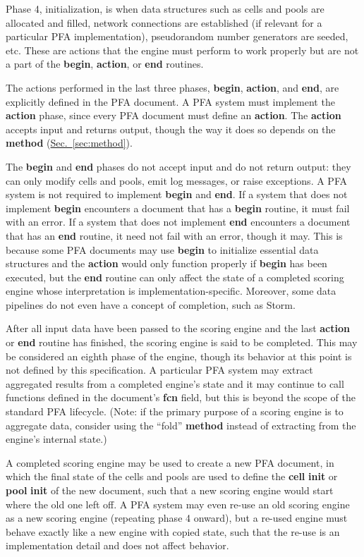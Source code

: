 \documentclass{article}
\newcommand{\PFAc}{\ttfamily\bfseries}
\theoremstyle{definition}
\begin{document}
Phase 4, initialization, is when data structures such as cells and pools are allocated and filled, network connections are established (if relevant for a particular PFA implementation), pseudorandom number generators are seeded, etc.  These are actions that the engine must perform to work properly but are not a part of the {\PFAc begin}, {\PFAc action}, or {\PFAc end} routines.

The actions performed in the last three phases, {\PFAc begin}, {\PFAc action}, and {\PFAc end}, are explicitly defined in the PFA document.  A PFA system must implement the {\PFAc action} phase, since every PFA document must define an {\PFAc action}.  The {\PFAc action} accepts input and returns output, though the way it does so depends on the {\PFAc method} (\hyperlink{hsec:method}{Sec.~\ref{sec:method}}).

The {\PFAc begin} and {\PFAc end} phases do not accept input and do not return output: they can only modify cells and pools, emit log messages, or raise exceptions.  A PFA system is not required to implement {\PFAc begin} and {\PFAc end}.  If a system that does not implement {\PFAc begin} encounters a document that has a {\PFAc begin} routine, it must fail with an error.  If a system that does not implement {\PFAc end} encounters a document that has an {\PFAc end} routine, it need not fail with an error, though it may.  This is because some PFA documents may use {\PFAc begin} to initialize essential data structures and the {\PFAc action} would only function properly if {\PFAc begin} has been executed, but the {\PFAc end} routine can only affect the state of a completed scoring engine whose interpretation is implementation-specific.  Moreover, some data pipelines do not even have a concept of completion, such as Storm.

After all input data have been passed to the scoring engine and the last {\PFAc action} or {\PFAc end} routine has finished, the scoring engine is said to be completed.  This may be considered an eighth phase of the engine, though its behavior at this point is not defined by this specification.  A particular PFA system may extract aggregated results from a completed engine's state and it may continue to call functions defined in the document's {\PFAc fcn} field, but this is beyond the scope of the standard PFA lifecycle.  (Note: if the primary purpose of a scoring engine is to aggregate data, consider using the ``fold'' {\PFAc method} instead of extracting from the engine's internal state.)

A completed scoring engine may be used to create a new PFA document, in which the final state of the cells and pools are used to define the {\PFAc cell} {\PFAc init} or {\PFAc pool} {\PFAc init} of the new document, such that a new scoring engine would start where the old one left off.  A PFA system may even re-use an old scoring engine as a new scoring engine (repeating phase 4 onward), but a re-used engine must behave exactly like a new engine with copied state, such that the re-use is an implementation detail and does not affect behavior.
\end{document}
